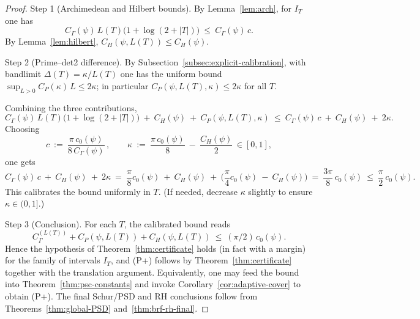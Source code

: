 \documentclass[11pt]{article}
\theoremstyle{definition}
\theoremstyle{remark}
\begin{document}
\begin{proof}
Step 1 (Archimedean and Hilbert bounds). By Lemma~\ref{lem:arch}, for $I_T$ one has
\[
  C_\Gamma(\psi)\,L(T)\big(1+\log(2+|T|)\big)\ \le\ C_\Gamma(\psi)\,c.
\]
By Lemma~\ref{lem:hilbert}, $C_H(\psi,L(T))\le C_H(\psi)$.

Step 2 (Prime–det2 difference). By Subsection~\ref{subsec:explicit-calibration}, with bandlimit $\Delta(T)=\kappa/L(T)$ one has the uniform bound $\sup_{L>0} C_P(\kappa)\,L\le 2\kappa$; in particular $C_P(\psi,L(T),\kappa)\le 2\kappa$ for all $T$.

Combining the three contributions,
\[
  C_\Gamma(\psi)\,L(T)\big(1+\log(2+|T|)\big)\ +\ C_H(\psi)\ +\ C_P(\psi,L(T),\kappa)
  \ \le\ C_\Gamma(\psi)\,c\ +\ C_H(\psi)\ +\ 2\kappa.
\]
Choosing
\[
  c\ :=\ \frac{\pi\,c_0(\psi)}{8\,C_\Gamma(\psi)}\,,\qquad
  \kappa\ :=\ \frac{\pi\,c_0(\psi)}{8}\ -\ \frac{C_H(\psi)}{2}\,\in[0,1],
\]
one gets
\[
  C_\Gamma(\psi)\,c\ +\ C_H(\psi)\ +\ 2\kappa\ =\ \frac{\pi}{8}c_0(\psi)\ +\ C_H(\psi)\ +\ \Big(\frac{\pi}{4}c_0(\psi)\ -\ C_H(\psi)\Big)
  \ =\ \frac{3\pi}{8}\,c_0(\psi)\ \le\ \frac{\pi}{2}\,c_0(\psi).
\]
This calibrates the bound uniformly in $T$. (If needed, decrease $\kappa$ slightly to ensure $\kappa\in(0,1]$.)

Step 3 (Conclusion). For each $T$, the calibrated bound reads
\[
  C_\Gamma^{(L(T))}+C_P(\psi,L(T)) + C_H(\psi,L(T))\ \le\ (\pi/2)\,c_0(\psi).
\]
Hence the hypothesis of Theorem~\ref{thm:certificate} holds (in fact with a margin) for the family of intervals $I_T$, and (P+) follows by Theorem~\ref{thm:certificate} together with the translation argument. Equivalently, one may feed the bound into Theorem~\ref{thm:psc-constants} and invoke Corollary~\ref{cor:adaptive-cover} to obtain (P+). The final Schur/PSD and RH conclusions follow from Theorems~\ref{thm:global-PSD} and~\ref{thm:brf-rh-final}.
\end{proof}

% 
\end{document}
